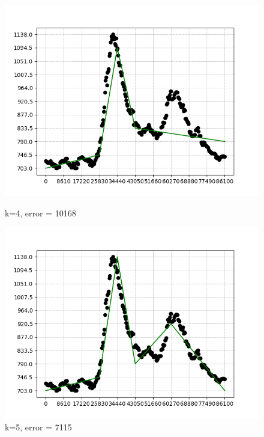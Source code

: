 \documentclass{article}
\begin{document}
\begin{figure}[h!]
          \centering
          \begin{minipage}{.3\textwidth}
            \centering
            \includegraphics[width=.9\linewidth]{graficos/solution_11x11,4N_optimistic_instance.png}
            \caption{k=4, error = 10168 }
          \end{minipage}%
          \begin{minipage}{.3\textwidth}
            \centering
            \includegraphics[width=.9\linewidth]{graficos/solution_11x11,5N_optimistic_instance.png}
            \caption{k=5, error = 7115 }
          \end{minipage}%
          \begin{minipage}{.3\textwidth}
            \centering

\end{minipage}
\end{figure}
\end{document}
